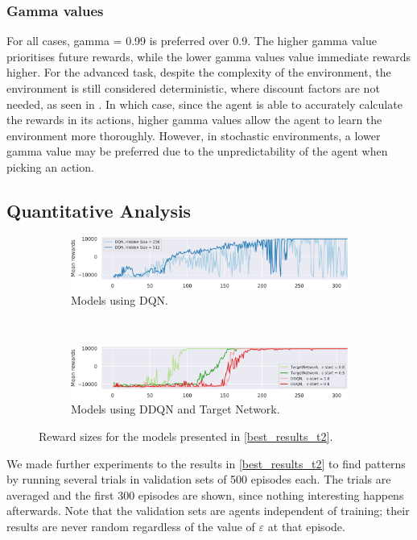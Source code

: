 \subsubsection{Gamma values}
For all cases, gamma = 0.99 is preferred over 0.9. The higher gamma value prioritises future rewards, while the lower gamma values value immediate rewards higher. For the advanced task, despite the complexity of the environment, the environment is still considered deterministic, where discount factors are not needed, as seen in \cite{DRL_Hands_On}. In which case, since the agent is able to accurately calculate the rewards in its actions, higher gamma values allow the agent to learn the environment more thoroughly. However, in stochastic environments, a lower gamma value may be preferred due to the unpredictability of the agent when picking an action.

\subsection{Quantitative Analysis}
\label{candidate_comparison}

\begin{figure}[h]
	\begin{subfigure}{\textwidth}
		\includegraphics[width=\textwidth]{dqn_reward_size.png}
		\caption{Models using DQN.}
		\label{dqn_avg_reward}
	\end{subfigure} \\[1ex]
	\begin{subfigure}{\textwidth}
		\includegraphics[width=\textwidth]{rest_reward_size.png}
		\caption{Models using DDQN and Target Network.}
		\label{rest_avg_reward}
	\end{subfigure}
	\caption{Reward sizes for the models presented in \cref{best_results_t2}.}
	\label{avg_reward}
\end{figure}

We made further experiments to the results in \cref{best_results_t2} to find patterns by running several trials in validation sets of 500 episodes each.
The trials are averaged and the first 300 episodes are shown, since nothing interesting happens afterwards.
Note that the validation sets are agents independent of training; their results are never random regardless of the value of $\varepsilon$ at that episode.

